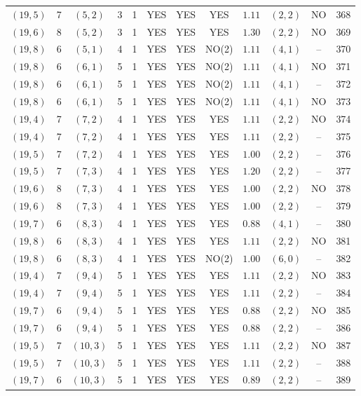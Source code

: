 \begin{longtable}{|c|c|c|c|c|c|c|c|c|c|c|c|}
$(19,5)$ & 7 & $(5,2)$ & 3 & 1 & YES & YES & YES & $1.11$ & $(2,2)$ & NO & 368\\
$(19,6)$ & 8 & $(5,2)$ & 3 & 1 & YES & YES & YES & $1.30$ & $(2,2)$ & NO & 369\\
$(19,8)$ & 6 & $(5,1)$ & 4 & 1 & YES & YES & NO(2) & $1.11$ & $(4,1)$ & -- & 370\\
$(19,8)$ & 6 & $(6,1)$ & 5 & 1 & YES & YES & NO(2) & $1.11$ & $(4,1)$ & NO & 371\\
$(19,8)$ & 6 & $(6,1)$ & 5 & 1 & YES & YES & NO(2) & $1.11$ & $(4,1)$ & -- & 372\\
$(19,8)$ & 6 & $(6,1)$ & 5 & 1 & YES & YES & NO(2) & $1.11$ & $(4,1)$ & NO & 373\\
$(19,4)$ & 7 & $(7,2)$ & 4 & 1 & YES & YES & YES & $1.11$ & $(2,2)$ & NO & 374\\
$(19,4)$ & 7 & $(7,2)$ & 4 & 1 & YES & YES & YES & $1.11$ & $(2,2)$ & -- & 375\\
$(19,5)$ & 7 & $(7,2)$ & 4 & 1 & YES & YES & YES & $1.00$ & $(2,2)$ & -- & 376\\
$(19,5)$ & 7 & $(7,3)$ & 4 & 1 & YES & YES & YES & $1.20$ & $(2,2)$ & -- & 377\\
$(19,6)$ & 8 & $(7,3)$ & 4 & 1 & YES & YES & YES & $1.00$ & $(2,2)$ & NO & 378\\
$(19,6)$ & 8 & $(7,3)$ & 4 & 1 & YES & YES & YES & $1.00$ & $(2,2)$ & -- & 379\\
$(19,7)$ & 6 & $(8,3)$ & 4 & 1 & YES & YES & YES & $0.88$ & $(4,1)$ & -- & 380\\
$(19,8)$ & 6 & $(8,3)$ & 4 & 1 & YES & YES & YES & $1.11$ & $(2,2)$ & NO & 381\\
$(19,8)$ & 6 & $(8,3)$ & 4 & 1 & YES & YES & NO(2) & $1.00$ & $(6,0)$ & -- & 382\\
$(19,4)$ & 7 & $(9,4)$ & 5 & 1 & YES & YES & YES & $1.11$ & $(2,2)$ & NO & 383\\
$(19,4)$ & 7 & $(9,4)$ & 5 & 1 & YES & YES & YES & $1.11$ & $(2,2)$ & -- & 384\\
$(19,7)$ & 6 & $(9,4)$ & 5 & 1 & YES & YES & YES & $0.88$ & $(2,2)$ & NO & 385\\
$(19,7)$ & 6 & $(9,4)$ & 5 & 1 & YES & YES & YES & $0.88$ & $(2,2)$ & -- & 386\\
$(19,5)$ & 7 & $(10,3)$ & 5 & 1 & YES & YES & YES & $1.11$ & $(2,2)$ & NO & 387\\
$(19,5)$ & 7 & $(10,3)$ & 5 & 1 & YES & YES & YES & $1.11$ & $(2,2)$ & -- & 388\\
$(19,7)$ & 6 & $(10,3)$ & 5 & 1 & YES & YES & YES & $0.89$ & $(2,2)$ & -- & 389\\

\end{longtable}
